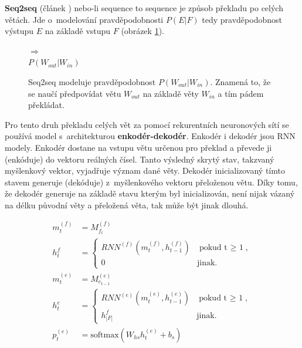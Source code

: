 \textbf{Seq2seq} (článek \cite{seq2seq}) nebo-li sequence to sequence je způsob překladu po celých větách. Jde o~modelování pravděpodobnosti $P(E|F)$ tedy pravděpodobnost výstupu $E$ na základě vstupu $F$ (obrázek \ref{figure:seqProbability}).

\begin{figure}[H]
    \begin{center}
        \setlength{\fboxsep}{8pt}
        $\Longrightarrow$
        \\ \vspace{5mm}
        $P(W_{out}|W_{in})$
    \end{center}
	\caption{Seq2seq modeluje pravděpodobnost $P(W_{out}|W_{in})$. Znamená to, že se naučí předpovídat větu $W_{out}$ na základě věty $W_{in}$ a tím pádem překládat.}
	\label{figure:seqProbability}
\end{figure}

Pro tento druh překladu celých vět za pomocí rekurentních neuronových sítí se používá model s~architekturou \textbf{enkodér-dekodér}. Enkodér i dekodér jsou RNN modely. Enkodér dostane na vstupu větu určenou pro překlad a převede ji (enkóduje) do vektoru reálných čísel. Tanto výsledný skrytý stav, takzvaný myšlenkový vektor, vyjadřuje význam dané věty. Dekodér inicializovaný tímto stavem generuje (dekóduje) z~myšlenkového vektoru přeloženou větu. Díky tomu, že dekodér generuje na základě stavu kterým byl inicializován, není nijak vázaný na délku původní věty a přeložená věta, tak může být jinak dlouhá.


\begin{align}
    m^{(f)}_{t}&=M^{(f)}_{f_t}\label{figure:encoderEmb} \\
    h^{f}_{t}&=\begin{cases}
                    RNN^{(f)}(m^{(f)}_{t},h^{(f)}_{t-1}) & \mbox{pokud t $\geq$ 1},\label{figure:encoderState} \\
                    0 & \mbox{jinak}.
                \end{cases}\\
    m^{(e)}_{t}&=M^{(e)}_{e_{t-1}}\label{figure:decoderEmb} \\
    h^{e}_{t}&=\begin{cases}
                    RNN^{(e)}(m^{(e)}_{t},h^{(e)}_{t-1}) & \mbox{pokud t $\geq$ 1},\\
                    h^{f}_{|F|} & \mbox{jinak}.
                \end{cases}\label{figure:decoderState} \\
    p^{(e)}_{t}&=\mbox{softmax}(W_{hs}h^{(e)}_{t} + b_{s}) \label{figure:resultSoftmax}
\end{align}



